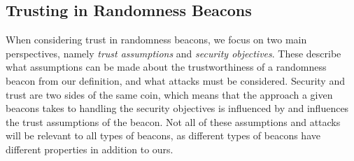 \subsection{Trusting in Randomness Beacons}
When considering trust in randomness beacons, we focus on two main perspectives, namely \emph{trust assumptions} and \emph{security objectives}.
These describe what assumptions can be made about the trustworthiness of a randomness beacon from our definition, and what attacks must be considered.
Security and trust are two sides of the same coin, which means that the approach a given beacons takes to handling the security objectives is influenced by and influences the trust assumptions of the beacon.
Not all of these assumptions and attacks will be relevant to all types of beacons, as different types of beacons have different properties in addition to ours.

